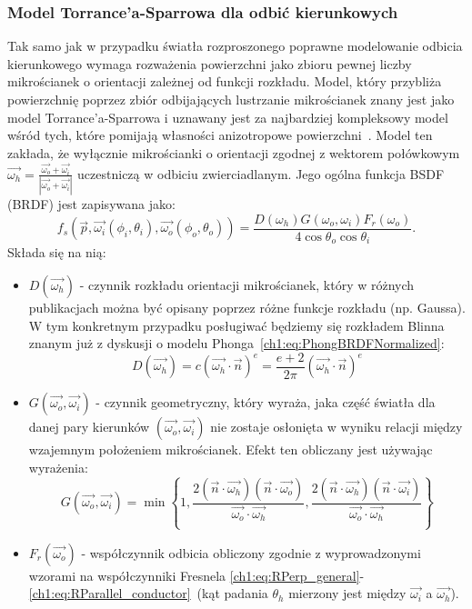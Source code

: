 \subsubsection{Model Torrance'a-Sparrowa dla odbić kierunkowych}
Tak samo jak w przypadku światła rozproszonego poprawne modelowanie odbicia kierunkowego wymaga rozważenia powierzchni jako zbioru pewnej liczby mikrościanek o orientacji zależnej od funkcji rozkładu. Model, który przybliża powierzchnię poprzez zbiór odbijających lustrzanie mikrościanek znany jest jako model Torrance'a-Sparrowa i uznawany jest za najbardziej kompleksowy model wśród tych, które pomijają własności anizotropowe powierzchni~\cite{Meister98investigationon}\cite{PBRT}. Model ten zakłada, że wyłącznie mikrościanki o orientacji zgodnej z wektorem połówkowym $\vec{\omega_h} = \frac{\vec{\omega_o} + \vec{\omega_i}}{|\vec{\omega_o} + \vec{\omega_i}|}$ uczestniczą w odbiciu zwierciadlanym.
Jego ogólna funkcja BSDF (BRDF) jest zapisywana jako:
\begin{equation}
f_s(\vec{p}, \vec{\omega_i}(\phi_i, \theta_i), \vec{\omega_o}(\phi_o, \theta_o)) = \frac{D(\omega_h)G(\omega_o, \omega_i)F_r(\omega_o)}{4\cos\theta_o\cos\theta_i}.
\label{ch1:eq:TorranceSparrowFull}
\end{equation}
Składa się na nią:
\begin{itemize}
\item[] $D(\vec{\omega_h})$ - czynnik rozkładu orientacji mikrościanek, który w różnych publikacjach można być opisany poprzez różne funkcje rozkładu (np. Gaussa). W tym konkretnym przypadku posługiwać będziemy się rozkładem Blinna znanym już z dyskusji o modelu Phonga~\eqref{ch1:eq:PhongBRDFNormalized}:
\begin{equation}
D(\vec{\omega_h}) = c(\vec{\omega_h}\cdot\vec{n})^e = \frac{e + 2}{2\pi}(\vec{\omega_h}\cdot\vec{n})^e
\end{equation}
\item[] $G(\vec{\omega_o}, \vec{\omega_i})$ - czynnik geometryczny, który wyraża, jaka część światła dla danej pary kierunków $(\vec{\omega_o}, \vec{\omega_i})$ nie zostaje osłonięta w wyniku relacji między wzajemnym położeniem mikrościanek. Efekt ten obliczany jest używając wyrażenia:
\begin{equation}
G(\vec{\omega_o}, \vec{\omega_i}) = \min\left\lbrace 1, \frac{2(\vec{n}\cdot\vec{\omega_h})(\vec{n}\cdot\vec{\omega_o})}{\vec{\omega_o}\cdot\vec{\omega_h}}, \frac{2(\vec{n}\cdot\vec{\omega_h})(\vec{n}\cdot\vec{\omega_i})}{\vec{\omega_o}\cdot\vec{\omega_h}} \right\rbrace
\end{equation}
\item[] $F_r(\vec{\omega_o})$ - współczynnik odbicia obliczony zgodnie z wyprowadzonymi wzorami na współczynniki Fresnela \eqref{ch1:eq:RPerp_general}-\eqref{ch1:eq:RParallel_conductor}~(kąt padania $\theta_h$ mierzony jest między $\vec{\omega_i}$ a $\vec{\omega_h}$). 
\end{itemize}
